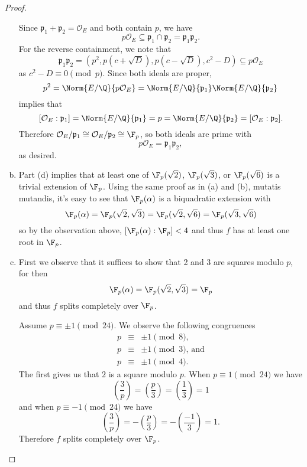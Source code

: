 \documentclass[10pt]{amsart}
\begin{document}
\begin{thm}
\begin{proof}
\begin{enumerate}[(a)]
			Since $\mathfrak{p}_1 + \mathfrak{p}_2 = \mathcal{O}_E$ and both contain $p$, we have
			$$p\mathcal{O}_E \subseteq \mathfrak{p}_1 \cap \mathfrak{p}_2 = \mathfrak{p}_1\mathfrak{p}_2.$$	
			For the reverse containment, we note that
			$$\mathfrak{p}_1\mathfrak{p}_2 = \left(p^2, p(c + \sqrt{D}), p(c - \sqrt{D}), c^2 - D\right) \subseteq p\mathcal{O}_E$$
			as $c^2 - D \equiv 0 \pmod{p}$.
			Since both ideals are proper,
			$$p^2 = \Norm{E/\Q}{p\mathcal{O}_E} = \Norm{E/\Q}{\mathfrak{p}_1}\Norm{E/\Q}{\mathfrak{p}_2}$$
			implies that 
			$$[\mathcal{O}_E : \mathfrak{p}_1] = \Norm{E/\Q}{\mathfrak{p}_1} = p = \Norm{E/\Q}{\mathfrak{p}_2} = [\mathcal{O}_E : \mathfrak{p}_2].$$
			Therefore $\mathcal{O}_E/\mathfrak{p}_1 \cong \mathcal{O}_E/\mathfrak{p}_2 \cong \F_p$, so both ideals are prime with
			$$p\mathcal{O}_E = \mathfrak{p}_1\mathfrak{p}_2,$$
			as desired.
			\item
			Part (d) implies that at least one of $\F_p(\sqrt{2})$, $\F_p(\sqrt{3})$, or $\F_p(\sqrt{6})$ is a trivial extension of $\F_p$.
			Using the same proof as in (a) and (b), mutatis mutandis, it's easy to see that $\F_p(\alpha)$ is a biquadratic extension with
			$$\F_p(\alpha) = \F_p(\sqrt{2}, \sqrt{3}) = \F_p(\sqrt{2},\sqrt{6}) = \F_p(\sqrt{3},\sqrt{6})$$
			so by the observation above,
			$[\F_p(\alpha) : \F_p] < 4$
			and thus $f$ has at least one root in $\F_p$. 
			\item
			First we observe that it suffices to show that 2 and 3 are squares modulo $p$, for then
			$$\F_p(\alpha) = \F_p(\sqrt{2}, \sqrt{3}) = \F_p$$
			and thus $f$ splits completely over $\F_p$.
			
			Assume $p \equiv \pm 1 \pmod{24}$.
			We observe the following congruences
			\begin{eqnarray*}
				p &\equiv& \pm 1 \pmod{8},\\
				p &\equiv& \pm 1 \pmod{3},\, \text{and}\\
				p &\equiv& \pm 1 \pmod{4}.
			\end{eqnarray*}
			The first gives us that $2$ is a square modulo $p$.
			When $p \equiv 1 \pmod{24}$ we have
			$$\left(\frac{3}{p}\right) = \left(\frac{p}{3}\right) = \left(\frac{1}{3}\right) = 1$$
			and when $p \equiv -1 \pmod{24}$ we have
			$$\left(\frac{3}{p}\right) = -\left(\frac{p}{3}\right) = -\left(\frac{-1}{3}\right) = 1.$$
			Therefore $f$ splits completely over $\F_p$.
		\end{enumerate}
	\end{proof}
\end{thm}
\end{document}
